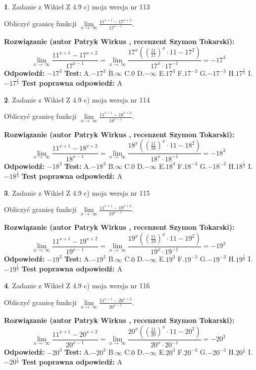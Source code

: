 \documentclass[12pt, a4paper]{article}
\theoremstyle{definition} %
\newtheorem{zad}{}
\newcommand{\zadStart}[1]{\begin{zad}#1\newline}
\newcommand{\zadStop}{\end{zad}}
\newcommand{\rozwStart}[2]{\noindent \textbf{Rozwiązanie (autor #1 , recenzent #2): }\newline}
\newcommand{\rozwStop}{\newline}
\newcommand{\odpStart}{\noindent \textbf{Odpowiedź:}\newline}
\newcommand{\odpStop}{\newline}
\newcommand{\testStart}{\noindent \textbf{Test:}\newline}
\newcommand{\testStop}{\newline}
\newcommand{\kluczStart}{\noindent \textbf{Test poprawna odpowiedź:}\newline}
\newcommand{\kluczStop}{\newline}
\begin{document}
\zadStart{Zadanie z Wikieł Z 4.9 c) moja wersja nr 113}


Obliczyć granicę funkcji  $\lim\limits_{x\to\ \infty}\frac{11^{x+1}-17^{x+2}}{17^{x-1}}$.
\zadStop
\rozwStart{Patryk Wirkus}{Szymon Tokarski}
$$\lim\limits_{x\to\ \infty}\frac{11^{x+1}-17^{x+2}}{17^{x-1}}=\lim\limits_{x\to\ \infty}\frac{17^{x}((\frac{11}{17})^{x}\cdot 11 -17^{2})}{17^{x}\cdot 17^{-1}} = -17^{3}$$
\rozwStop
\odpStart
$-17^{3}$
\odpStop
\testStart
A.$-17^{3}$ B.$\infty$ C.$0$ D.$-\infty$ E.$17^{3}$
F.$17^{-3}$ G.$-17^{-3}$
H.$17^{\frac{1}{3}}$
I.$-17^{\frac{1}{3}}$
\testStop
\kluczStart
A
\kluczStop



\zadStart{Zadanie z Wikieł Z 4.9 c) moja wersja nr 114}


Obliczyć granicę funkcji  $\lim\limits_{x\to\ \infty}\frac{11^{x+1}-18^{x+2}}{18^{x-1}}$.
\zadStop
\rozwStart{Patryk Wirkus}{Szymon Tokarski}
$$\lim\limits_{x\to\ \infty}\frac{11^{x+1}-18^{x+2}}{18^{x-1}}=\lim\limits_{x\to\ \infty}\frac{18^{x}((\frac{11}{18})^{x}\cdot 11 -18^{2})}{18^{x}\cdot 18^{-1}} = -18^{3}$$
\rozwStop
\odpStart
$-18^{3}$
\odpStop
\testStart
A.$-18^{3}$ B.$\infty$ C.$0$ D.$-\infty$ E.$18^{3}$
F.$18^{-3}$ G.$-18^{-3}$
H.$18^{\frac{1}{3}}$
I.$-18^{\frac{1}{3}}$
\testStop
\kluczStart
A
\kluczStop



\zadStart{Zadanie z Wikieł Z 4.9 c) moja wersja nr 115}


Obliczyć granicę funkcji  $\lim\limits_{x\to\ \infty}\frac{11^{x+1}-19^{x+2}}{19^{x-1}}$.
\zadStop
\rozwStart{Patryk Wirkus}{Szymon Tokarski}
$$\lim\limits_{x\to\ \infty}\frac{11^{x+1}-19^{x+2}}{19^{x-1}}=\lim\limits_{x\to\ \infty}\frac{19^{x}((\frac{11}{19})^{x}\cdot 11 -19^{2})}{19^{x}\cdot 19^{-1}} = -19^{3}$$
\rozwStop
\odpStart
$-19^{3}$
\odpStop
\testStart
A.$-19^{3}$ B.$\infty$ C.$0$ D.$-\infty$ E.$19^{3}$
F.$19^{-3}$ G.$-19^{-3}$
H.$19^{\frac{1}{3}}$
I.$-19^{\frac{1}{3}}$
\testStop
\kluczStart
A
\kluczStop



\zadStart{Zadanie z Wikieł Z 4.9 c) moja wersja nr 116}


Obliczyć granicę funkcji  $\lim\limits_{x\to\ \infty}\frac{11^{x+1}-20^{x+2}}{20^{x-1}}$.
\zadStop
\rozwStart{Patryk Wirkus}{Szymon Tokarski}
$$\lim\limits_{x\to\ \infty}\frac{11^{x+1}-20^{x+2}}{20^{x-1}}=\lim\limits_{x\to\ \infty}\frac{20^{x}((\frac{11}{20})^{x}\cdot 11 -20^{2})}{20^{x}\cdot 20^{-1}} = -20^{3}$$
\rozwStop
\odpStart
$-20^{3}$
\odpStop
\testStart
A.$-20^{3}$ B.$\infty$ C.$0$ D.$-\infty$ E.$20^{3}$
F.$20^{-3}$ G.$-20^{-3}$
H.$20^{\frac{1}{3}}$
I.$-20^{\frac{1}{3}}$
\testStop
\kluczStart
A
\kluczStop
\end{document}
